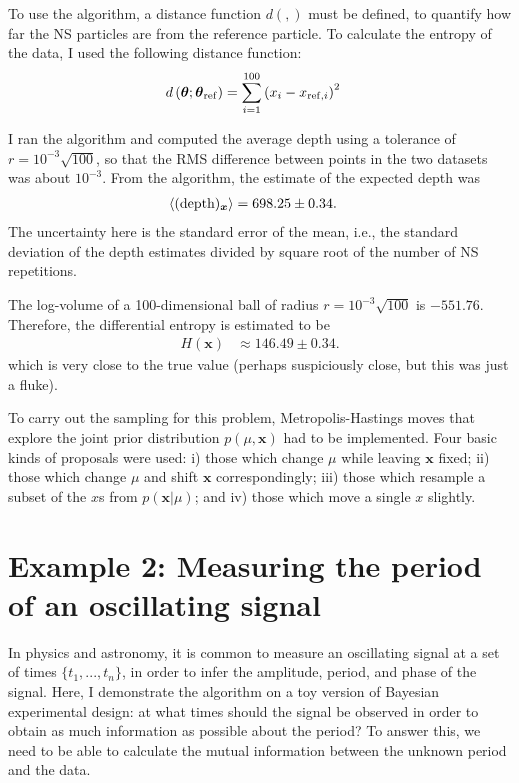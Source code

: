 \documentclass[entropy,article,accept,oneauthor,pdftex,10pt,a4paper]{mdpi}
\newcommand{\x}{\boldsymbol{\theta}}
\newcommand{\depth}{(\textnormal{depth})}
\newcommand{\xref}{\x_{\rm ref}}
\begin{document}
To use the algorithm, a distance function $d(,)$ must be defined, to quantify
how far the NS particles are from the reference particle. To calculate
the entropy of the data, I used the following distance function:
\begin{align}
d\left(\x; \xref\right) &= \sum_{i=1}^{100}\left(x_i - x_{{\rm ref}, i}\right)^2
\end{align}

I ran the algorithm and computed the average depth using a tolerance of
$r=10^{-3}\sqrt{100}$, so that the RMS difference between
points in the two datasets was about $10^{-3}$.
From the algorithm, the estimate of the expected depth was
\begin{align}
\left<\depth_{\boldsymbol{x}}\right> &= 698.25 \pm 0.34.
\end{align}
The uncertainty here is the standard error of the mean, i.e., the
standard deviation of the depth estimates divided by square root of
the number of NS repetitions.

The log-volume of a 100-dimensional ball of radius
$r=10^{-3}\sqrt{100}$ is
$-551.76$. Therefore, the differential entropy is estimated to be
\begin{align}
H(\boldsymbol{x}) &\approx 146.49 \pm 0.34.
\end{align}
which is very close to the true value (perhaps suspiciously close, but this
was just a fluke).

To carry out the sampling for this problem, Metropolis-Hastings moves that
explore the joint prior distribution $p(\mu, \boldsymbol{x})$ had to be
implemented. Four basic kinds of proposals were used: i) those which change
$\mu$ while leaving $\boldsymbol{x}$ fixed; ii) those which change $\mu$ and
shift $\boldsymbol{x}$ correspondingly; iii) those which resample a subset
of the $x$s from $p(\boldsymbol{x}|\mu)$; and iv) those which move a single
$x$ slightly.

\section{Example 2: Measuring the period of an oscillating signal}

In physics and astronomy, it is common to measure an oscillating signal
at a set of times $\{t_1, ..., t_n\}$, in order to infer the amplitude,
period, and phase of the signal.
Here, I demonstrate the algorithm on a toy version
of Bayesian experimental design: at what times should the signal be
observed in order to obtain as much information as possible about the
period? To answer this, we need to be able to calculate the mutual
information between the unknown period and the data.
\end{document}
